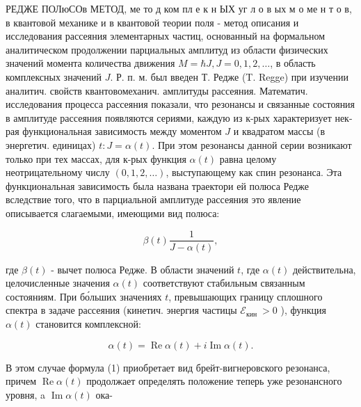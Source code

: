 \documentclass[10pt]{article}
\begin{document}
РЕДЖЕ ПОЛюСОв МЕТОД, ме то д ком пл е к н ЫХ уг л о в ых м о ме н т о в, в квантовой механике и в квантовой теории поля - метод описания и исследования рассеяния элементарных частиц, основанный на формальном аналитическом продолжении парциальных амплитуд из области физических значений момента количества движения $M=\hbar J, J=0,1,2, \ldots$, в область комплексных значений $J$. Р. п. м. был введен Т. Редже (T. Regge) при изучении аналитич. свойств квантовомеханич. амплитуды рассеяния. Математич. исследования процесса рассеяния показали, что резонансы и связанные состояния в амплитуде рассеяния появляются сериями, каждую из к-рых характеризует нек-рая функциональная зависимость между моментом $J$ и квадратом массы (в энергетич. единицах) $t: J=\alpha(t)$. При этом резонансы данной серии возникают только при тех массах, для к-рых функция $\alpha(t)$ равна целому неотрицательному числу $(0,1,2, \ldots)$, выступающему как спин резонанса. Эта функциональная зависимость была названа траектори ей полюса Редже вследствие того, что в парциальной амплитуде рассеяния это явление описывается слагаемыми, имеющими вид полюса:



\[

\beta(t) \frac{1}{J-\alpha(t)},

\]



где $\beta(t)$ - вычет полюса Редже. В области значений $t$, где $\alpha(t)$ действительна, целочисленные значения $\alpha(t)$ соответствуют стабильным связанным состояниям. При бо́льших значениях $t$, превышающих границу сплошного спектра в задаче рассеяния (кинетич. энергия частицы $\mathscr{E}_{\text {кин }}>0$ ), функция $\alpha(t)$ становится комплексной:



\[

\alpha(t)=\operatorname{Re} \alpha(t)+i \operatorname{Im} \alpha(t) .

\]



В этом случае формула (1) приобретает вид брейт-вигнеровского резонанса, причем $\operatorname{Re} \alpha(t)$ продолжает определять положение теперь уже резонансного уровня, a $\operatorname{Im} \alpha(t)$ ока-
\end{document}

